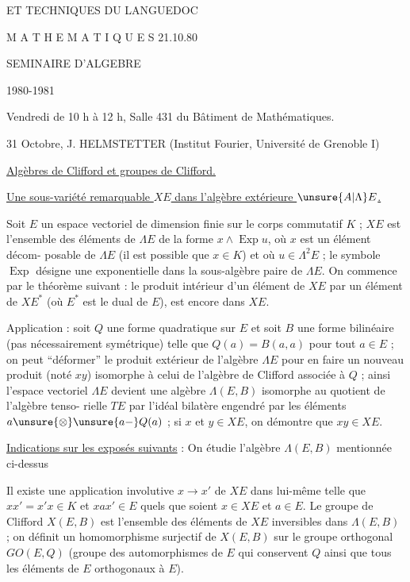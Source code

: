ET TECHNIQUES DU LANGUEDOC

M A T H E M A T I Q U E S \hfill 21.10.80

\begin{center}
SEMINAIRE D'ALGEBRE

1980-1981
\end{center}

Vendredi de 10 h à 12 h, Salle 431 du Bâtiment de Mathématiques.

31 Octobre, J. HELMSTETTER (Institut Fourier, Université de Grenoble I)

\uline{Algèbres de Clifford et groupes de Clifford.}

\uline{Une sous-variété remarquable $XE$ dans l'algèbre extérieure $\unsure{A|\Lambda}E$.}

Soit $E$ un espace vectoriel de dimension finie sur le corps commutatif $K$ ; $XE$ est l'ensemble des éléments de $\Lambda E$ de la forme $x\wedge\operatorname{Exp}u$, où $x$ est un élément décom-\newline
posable de $\Lambda E$ (il est possible que $x\in K$) et où $u\in\Lambda^2E$ ; le symbole $\operatorname{Exp}$ désigne une exponentielle dans la sous-algèbre paire de $\Lambda E$. On commence par le théorème suivant : le produit intérieur d'un élément de $XE$ par un élément de $XE^*$ (où $E^*$ est le dual de $E$), est encore dans $XE$.

Application : soit $Q$ une forme quadratique sur $E$ et soit $B$ une forme bilinéaire (pas nécessairement symétrique) telle que $Q(a)=B(a,a)$ pour tout $a\in E$ ; on peut ``déformer'' le produit extérieur de l'algèbre $\Lambda E$ pour en faire un nouveau produit (noté $xy$) isomorphe à celui de l'algèbre de Clifford associée à $Q$ ; ainsi l'espace vectoriel $\Lambda E$ devient une algèbre $\Lambda(E,B)$ isomorphe au quotient de l'algèbre tenso-\newline
rielle $TE$ par l'idéal bilatère engendré par les éléments $a\unsure{\otimes}\unsure{a-}Q(a)$ ; si $x$ et $y\in XE$, on démontre que $xy\in XE$.

\uline{Indications sur les exposés suivants} : On étudie l'algèbre $\Lambda(E,B)$ mentionnée ci-dessus

Il existe une application involutive $x\to x'$ de $XE$ dans lui-même telle que $xx'=x'x\in K$ et $xax'\in E$ quels que soient $x\in XE$ et $a\in E$. Le groupe de Clifford $X(E,B)$ est l'ensemble des éléments de $XE$ inversibles dans $\Lambda(E,B)$ ; on définit un homomorphisme surjectif de $X(E,B)$ sur le groupe orthogonal $GO(E,Q)$ (groupe des automorphismes de $E$ qui conservent $Q$ ainsi que tous les éléments de $E$ orthogonaux à $E$).

